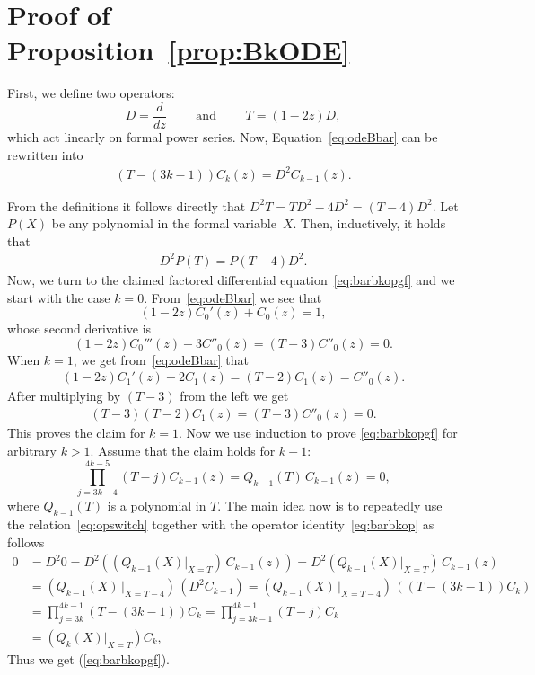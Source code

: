 \documentclass[a4paper,UKenglish,cleveref, autoref, thm-restate]{lipics-v2021}
\begin{document}


\clearpage
\appendix

\section{Proof of Proposition~\ref{prop:BkODE}}

First, we define two operators:
\[D=\frac{d}{dz} \qquad \text{ and } \qquad  T=(1-2z)D, \]
which act linearly on formal power series. 
Now, Equation~\eqref{eq:odeBbar} can  be  rewritten  into
\begin{align}
\label{eq:barbkop}
(T-(3k-1)){C}_k(z)=D^2{C}_{k-1}(z).
\end{align}

From the definitions it follows directly that $D^2T=TD^2-4D^2=(T-4)D^2$.
Let $P(X)$ be any polynomial in the formal variable~$X$. Then, inductively, it holds that
\begin{align}
\label{eq:opswitch}
D^2 P(T)=P(T-4) D^2.    
\end{align}
Now, we turn to the claimed factored differential equation~\eqref{eq:barbkopgf} and we start with the case $k=0$.
From~\eqref{eq:odeBbar} we see that
\[(1-2z) {C}_0'(z)+{C}_0(z)=1, \] whose second derivative is 
\[(1-2z) {C}_0'''(z)-3{C}''_0(z)=(T-3){C}''_0(z)=0. \]
When $k=1$, we get from~\eqref{eq:odeBbar} that 
\begin{align*}
(1-2z) {C}_1'(z)-2{C}_1(z)=(T-2){C}_1(z)={C}''_0(z).
\end{align*}
After multiplying by $(T-3)$ from the left we get
\begin{align*}
(T-3)(T-2){C}_1(z)
=(T-3){C}''_0(z)=0.    
\end{align*}
This proves the claim for $k=1$.
Now we use induction to prove \eqref{eq:barbkopgf} for arbitrary $k>1$.
Assume that the claim holds for $k-1$: 
\[\prod_{j=3k-4}^{4k-5}(T-j){C}_{k-1}(z)=Q_{k-1}(T) \,{C}_{k-1}(z)=0, \]
where $Q_{k-1}(T)$ is a polynomial in $T$. 
The main idea now is to repeatedly use the relation~\eqref{eq:opswitch} together with the operator identity~\eqref{eq:barbkop} as follows
\begin{align*}
0&=D^2 0=D^2((Q_{k-1}(X)\big|_{X=T}) \,{C}_{k-1}(z))=D^2(Q_{k-1}(X)\big|_{X=T}) \,{C}_{k-1}(z) \\&=(Q_{k-1}(X) \,\big|_{X=T-4}) \,(D^2 {C}_{k-1})=(Q_{k-1}(X) \,\big|_{X=T-4}) \, ((T-(3k-1)){C}_k) \\&=\prod_{j=3k}^{4k-1}(T-(3k-1)){C}_k =\prod_{j=3k-1}^{4k-1}(T-j) {C}_k \\&=(Q_{k}(X)\big|_{X=T}) {C}_k,     
\end{align*}
Thus we get (\ref{eq:barbkopgf}).
\end{document}
